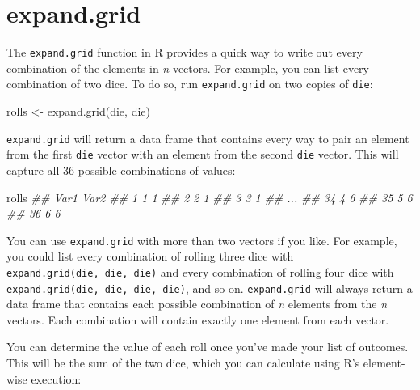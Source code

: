\documentclass[
  letterpaper,
  DIV=11,
  numbers=noendperiod]{scrbook}
\newenvironment{Shaded}{\begin{snugshade}}{\end{snugshade}}
\newcommand{\DecValTok}[1]{\textcolor[rgb]{0.68,0.00,0.00}{#1}}
\newcommand{\DocumentationTok}[1]{\textcolor[rgb]{0.37,0.37,0.37}{\textit{#1}}}
\newcommand{\FunctionTok}[1]{\textcolor[rgb]{0.28,0.35,0.67}{#1}}
\newcommand{\NormalTok}[1]{\textcolor[rgb]{0.00,0.23,0.31}{#1}}
\newcommand{\OtherTok}[1]{\textcolor[rgb]{0.00,0.23,0.31}{#1}}
\newcommand{\SpecialCharTok}[1]{\textcolor[rgb]{0.37,0.37,0.37}{#1}}
\begin{document}
\section{expand.grid}\label{expand.grid}

The \texttt{expand.grid} function in R provides a quick way to write out
every combination of the elements in \emph{n} vectors. For example, you
can list every combination of two dice. To do so, run
\texttt{expand.grid} on two copies of \texttt{die}:

\begin{Shaded}
\begin{Highlighting}[]
\NormalTok{rolls }\OtherTok{\textless{}{-}} \FunctionTok{expand.grid}\NormalTok{(die, die)}
\end{Highlighting}
\end{Shaded}

\texttt{expand.grid} will return a data frame that contains every way to
pair an element from the first \texttt{die} vector with an element from
the second \texttt{die} vector. This will capture all 36 possible
combinations of values:

\begin{Shaded}
\begin{Highlighting}[]
\NormalTok{rolls}
\DocumentationTok{\#\#    Var1 Var2}
\DocumentationTok{\#\# 1     1    1}
\DocumentationTok{\#\# 2     2    1}
\DocumentationTok{\#\# 3     3    1}
\DocumentationTok{\#\# ...}
\DocumentationTok{\#\# 34    4    6}
\DocumentationTok{\#\# 35    5    6}
\DocumentationTok{\#\# 36    6    6}
\end{Highlighting}
\end{Shaded}

You can use \texttt{expand.grid} with more than two vectors if you like.
For example, you could list every combination of rolling three dice with
\texttt{expand.grid(die,\ die,\ die)} and every combination of rolling
four dice with \texttt{expand.grid(die,\ die,\ die,\ die)}, and so on.
\texttt{expand.grid} will always return a data frame that contains each
possible combination of \emph{n} elements from the \emph{n} vectors.
Each combination will contain exactly one element from each vector.

You can determine the value of each roll once you've made your list of
outcomes. This will be the sum of the two dice, which you can calculate
using R's element-wise execution:

\begin{Shaded}
\end{Shaded}
\end{document}
